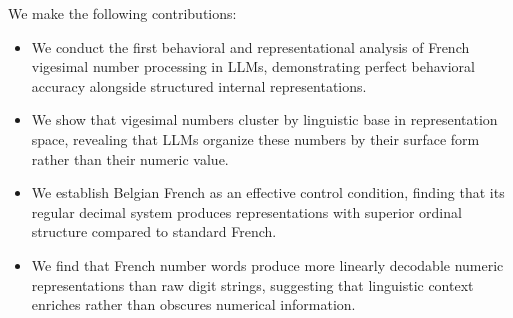 We make the following contributions:
\begin{itemize}[leftmargin=*,itemsep=0pt,topsep=0pt]
    \item We conduct the first behavioral and representational analysis of French vigesimal number processing in LLMs, demonstrating perfect behavioral accuracy alongside structured internal representations.
    \item We show that vigesimal numbers cluster by linguistic base in representation space, revealing that LLMs organize these numbers by their surface form rather than their numeric value.
    \item We establish Belgian French as an effective control condition, finding that its regular decimal system produces representations with superior ordinal structure compared to standard French.
    \item We find that French number words produce more linearly decodable numeric representations than raw digit strings, suggesting that linguistic context enriches rather than obscures numerical information.
\end{itemize}
